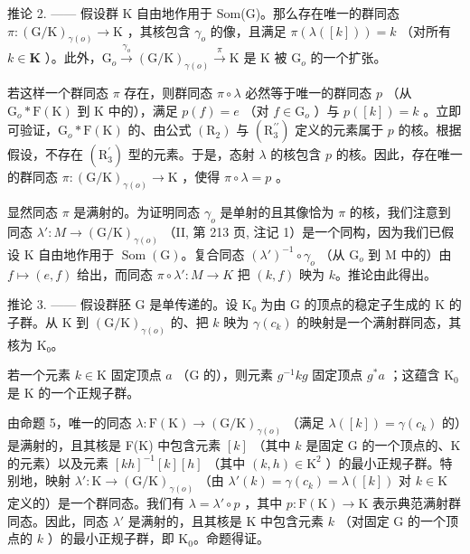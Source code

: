 推论 2. —— 假设群 K 自由地作用于 Som(G)。那么存在唯一的群同态 \(\pi\colon (\mathrm{G} / \mathrm{K})_{\gamma (o)}\to \mathrm{K}\) ，其核包含 \(\gamma_{o}\) 的像，且满足 \(\pi (\lambda ([k])) = k\) （对所有 \(k\in \mathbf{K}\) ）。此外，\(\mathrm{G}_o\xrightarrow{\gamma_o} (\mathrm{G} / \mathrm{K})_{\gamma (o)}\xrightarrow{\pi}\mathrm{K}\) 是 K 被 \(\mathrm{G}_o\) 的一个扩张。

若这样一个群同态 \(\pi\) 存在，则群同态 \(\pi \circ \lambda\) 必然等于唯一的群同态 \(p\) （从 \(\mathrm{G}_{o} * \mathrm{F}(\mathrm{K})\) 到 \(\mathrm{K}\) 中的），满足 \(p(f) = e\) （对 \(f \in \mathrm{G}_{o}\) ）与 \(p([k]) = k\) 。立即可验证，\(\mathrm{G}_{o} * \mathrm{F}(\mathrm{K})\) 的、由公式 \((\mathrm{R}_{2})\) 与 \((\mathrm{R}_{3}^{\prime \prime})\) 定义的元素属于 \(p\) 的核。根据假设，不存在 \((\mathrm{R}_{3}^{\prime})\) 型的元素。于是，态射 \(\lambda\) 的核包含 \(p\) 的核。因此，存在唯一的群同态 \(\pi: (\mathrm{G} / \mathrm{K})_{\gamma(o)} \to \mathrm{K}\) ，使得 \(\pi \circ \lambda = p\) 。

显然同态 \(\pi\) 是满射的。为证明同态 \(\gamma_{o}\) 是单射的且其像恰为 \(\pi\) 的核，我们注意到同态 \(\lambda'\colon M \to (\mathrm{G}/\mathrm{K})_{\gamma(o)}\) （II, 第 213 页, 注记 1）是一个同构，因为我们已假设 K 自由地作用于 \(\operatorname{Som}(\mathrm{G})\)。复合同态 \((\lambda')^{-1} \circ \gamma_{o}\) （从 \(\mathrm{G}_{o}\) 到 M 中的）由 \(f \mapsto (e, f)\) 给出，而同态 \(\pi \circ \lambda'\colon M \to K\) 把 \((k, f)\) 映为 \(k\)。推论由此得出。

推论 3. —— 假设群胚 G 是单传递的。设 K₀ 为由 G 的顶点的稳定子生成的 K 的子群。从 K 到 \((\mathrm{G}/\mathrm{K})_{\gamma(o)}\) 的、把 \(k\) 映为 \(\gamma(c_k)\) 的映射是一个满射群同态，其核为 K₀。

若一个元素 \(k \in \mathrm{K}\) 固定顶点 \(a\) （\(\mathrm{G}\) 的），则元素 \(g^{-1}kg\) 固定顶点 \(g^{*}a\) ；这蕴含 \(\mathrm{K}_{0}\) 是 \(\mathrm{K}\) 的一个正规子群。

由命题 5，唯一的同态 \(\lambda\colon\mathrm{F}(\mathrm{K})\to(\mathrm{G}/\mathrm{K})_{\gamma(o)}\) （满足 \(\lambda([k])=\gamma(c_k)\) 的）是满射的，且其核是 F(K) 中包含元素 \([k]\) （其中 \(k\) 是固定 G 的一个顶点的、K 的元素）以及元素 \([kh]^{-1}[k][h]\) （其中 \((k,h)\in\mathrm{K}^2\) ）的最小正规子群。特别地，映射 \(\lambda'\colon\mathrm{K}\to(\mathrm{G}/\mathrm{K})_{\gamma(o)}\) （由 \(\lambda'(k)=\gamma(c_k)=\lambda([k])\) 对 \(k\in\mathrm{K}\) 定义的）是一个群同态。我们有 \(\lambda=\lambda'\circ p\) ，其中 \(p\colon\mathrm{F}(\mathrm{K})\to\mathrm{K}\) 表示典范满射群同态。因此，同态 \(\lambda'\) 是满射的，且其核是 K 中包含元素 \(k\) （对固定 G 的一个顶点的 \(k\) ）的最小正规子群，即 \(\mathrm{K}_0\)。命题得证。
\relax{}
